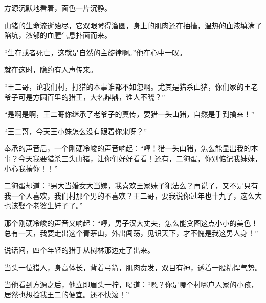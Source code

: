 \begin{this_body}
方源沉默地看着，面色一片沉静。

山猪的生命流逝殆尽，它双眼瞪得溜圆，身上的肌肉还在抽搐，温热的血液填满了陷坑，浓郁的血腥气息扑面而来。

“生存或者死亡，这就是自然的主旋律啊。”他在心中一叹。

就在这时，隐约有人声传来。

“王二哥，论我们村，打猎的本事谁都不如您啊。尤其是猎杀山猪，你们家的王老爷子可是方圆百里的猎王，大名鼎鼎，谁人不晓？”

“是啊是啊，王二哥你继承了老爷子的真传，要猎一头山猪，自然是手到擒来！”

“王二哥，今天王小妹怎么没有跟着你来呀？”

奉承的声音后，一个刚硬冷峻的声音响起：“哼！猎一头山猪，怎么能显出我的本事？今天我要猎杀三头山猪，让你们好好看看！还有，二狗蛋，你别惦记我妹妹，小心我揍你！！”

二狗蛋却道：“男大当婚女大当嫁，我喜欢王家妹子犯法么？再说了，又不是只有我一个人喜欢，我们村那个男的不喜欢？王二哥，要我说你过年也十九了，这么大也该娶个老婆生娃子了。”

那个刚硬冷峻的声音又响起：“哼，男子汉大丈夫，怎么能贪图这点小小的美色！总有一天，我要走出这个青茅山，外出闯荡，见识天下，才不愧是我这男人身！”

说话间，四个年轻的猎手从树林那边走了出来。

当头一位猎人，身高体长，背着弓箭，肌肉贲发，双目有神，透着一股精悍气势。

当他看到方源之后，他立即眉头一拧，喝道：“嗯？你是哪个村哪户人家的小孩，居然也想捡我王二的便宜。还不快滚！”

\end{this_body}

